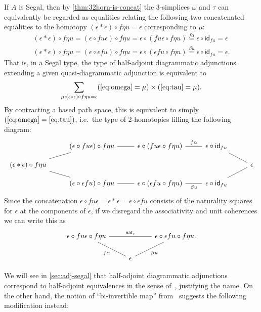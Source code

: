 \documentclass{amsart}
\theoremstyle{plain}
\theoremstyle{definition}
\theoremstyle{remark}
\numberwithin{equation}{section}
\newcommand{\idarr}[1]{\mathsf{id}_{#1}}
\begin{document}
If $A$ is Segal, then by \cref{thm:32horn-is-concat} the 3-simplices $\omega$ and $\tau$ can equivalently be regarded as equalities relating the following two concatenated equalities to the homotopy $(\epsilon\ast\epsilon) \circ f\eta u = \epsilon$ corresponding to $\mu$:
\begin{gather}
  (\epsilon\ast\epsilon) \circ f\eta u
  = (\epsilon \circ fu\epsilon) \circ f\eta u
  = \epsilon \circ (fu\epsilon \circ f\eta u)
  \overset{f\alpha}= \epsilon \circ \idarr{fu}
  = \epsilon \label{eq:omega}\\
  (\epsilon\ast\epsilon) \circ f\eta u
  = (\epsilon \circ \epsilon fu)\circ f\eta u
  = \epsilon \circ (\epsilon fu\circ f\eta u)
  \overset{\beta u}= \epsilon \circ \idarr{fu}
  = \epsilon.\label{eq:tau}
\end{gather}
That is, in a Segal type, the type of half-adjoint diagrammatic adjunctions extending a given quasi-diagrammatic adjunction is equivalent to
\[ \sum_{\mu:(\epsilon\ast\epsilon) \circ f\eta u = \epsilon} (\eqref{eq:omega}=\mu) \times (\eqref{eq:tau}=\mu). \]
By contracting a based path space, this is equivalent to simply $(\eqref{eq:omega}=\eqref{eq:tau})$, i.e.\ the type of 2-homotopies filling the following diagram:
\[
\begin{tikzcd}[row sep=small]
  & (\epsilon \circ fu\epsilon) \circ f\eta u \ar[r,-] &
  \epsilon \circ (fu\epsilon \circ f\eta u) \ar[r,-,"f\alpha"] &
  \epsilon \circ \idarr{fu} \ar[dr,-]\\
  (\epsilon\ast\epsilon) \circ f\eta u \ar[ur,-] \ar[dr,-] &&&& \epsilon\\
  & (\epsilon \circ \epsilon fu)\circ f\eta u \ar[r,-] &
  \epsilon \circ (\epsilon fu\circ f\eta u) \ar[r,-,"\beta u"'] &
  \epsilon \circ \idarr{fu} \ar[ur,-]
\end{tikzcd}
\]
Since the concatenation $\epsilon \circ fu\epsilon = \epsilon\ast\epsilon = \epsilon \circ \epsilon fu$ consists of the naturality squares for $\epsilon$ at the components of $\epsilon$, if we disregard the associativity and unit coherences we can write this as
\[
\begin{tikzcd}     \epsilon \circ fu\epsilon \circ f\eta u \ar[rr,-,"{\mathsf{nat}_\epsilon}"]  \ar[dr,-,"f\alpha"']  & &   \epsilon \circ \epsilon fu \circ f\eta u. \ar[dl,-,"\beta u"] \\ & \epsilon &
\end{tikzcd}
\]

We will see in \cref{sec:adj-segal} that half-adjoint diagrammatic adjunctions correspond to half-adjoint equivalences in the sense of~\cite[\S4.2]{hottbook}, justifying the name.
On the other hand, the notion of ``bi-invertible map'' from~\cite[\S4.3]{hottbook} suggests the following modification instead:
\end{document}
